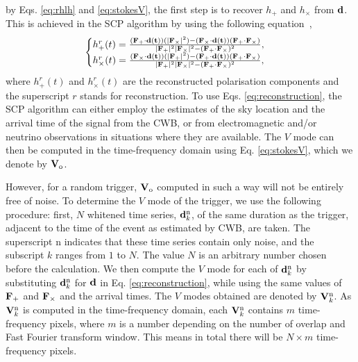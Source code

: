 \documentclass[aps,twocolumn,showpacs,groupedaddress, nofootinbib]{revtex4}  %
\begin{document}
by Eqs. \ref{eq:rhlh} and \ref{eq:stokesV},
the first step is to recover $h_+$ and $h_\times$ from $\bold{d}$.
This is achieved in the \ac{SCP} algorithm by using the following equation~\cite{di2018estimation},
\begin{equation}\label{eq:reconstruction}
\begin{cases} 
h^{r}_+(t) = \frac{(\bold{F}_+\cdot \bold{d}(\bold{t}))(\lvert\bold{F}_{\times}\rvert^{2}) - 
(\bold{F}_{\times}\cdot \bold{d}(\bold{t}))(\bold{F}_{+} \cdot \bold{F}_{\times})}
{\lvert\bold{F}_{+}\rvert^{2}\lvert\bold{F}_{\times}\rvert^{2} - (\bold{F}_{+} \cdot \bold{F}_{\times})^2},\\ 
h^{r}_\times(t) = \frac{(\bold{F}_{\times}\cdot \bold{d}(\bold{t}))(\lvert\bold{F}_{+}\rvert^{2}) - 
(\bold{F}_{+}\cdot \bold{d}(\bold{t}))(\bold{F}_{+} \cdot \bold{F}_{\times})}
{\lvert\bold{F}_{+}\rvert^{2}\lvert\bold{F}_{\times}\rvert^{2} - (\bold{F}_{+} \cdot \bold{F}_{\times})^2},\\
\end{cases} 
\end{equation}
where $h^{r}_+(t)$ and $h^{r}_\times(t) $ are the reconstructed polarisation components and the superscript $r$ stands for reconstruction. 
To use Eqs. \ref{eq:reconstruction}, the \ac{SCP} algorithm can either employ the estimates of the sky location and the arrival time of the signal from the \ac{CWB},
or from electromagnetic and/or neutrino observations in situations where they are available.  
The $V$ mode can then be computed in the time-frequency domain using Eq. \ref{eq:stokesV}, which we denote by $\bold{V}_\text{o}$.

However, for a random trigger, $\bold{V}_\text{o}$ computed in such a way will not be entirely free of noise.
To determine the $V$ mode of the trigger, we use the following procedure:
first, $N$ whitened time series, $\bold{d}^{\text{n}}_{k}$, of the same duration as the trigger, adjacent to the time of the event as estimated by \ac{CWB}, are taken.
The superscript $\text{n}$ indicates that these time series contain only noise, and the subscript $k$ ranges from $1$ to $N$.
The value $N$ is an arbitrary number chosen before the calculation.
We then compute the $V$ mode for each of $\bold{d}^{\text{n}}_{k}$ by substituting $\bold{d}^{\text{n}}_{k}$ for $\bold{d}$ in Eq. \ref{eq:reconstruction}, 
while using the same values of $\bold{F}_+$ and $\bold{F}_{\times}$
and the arrival times.
The $V$ modes obtained are denoted by $\bold{V}_{k}^{\text{n}}$.
As $\bold{V}_{k}^{\text{n}}$ is computed in the time-frequency domain, each $\bold{V}_{k}^{\text{n}}$ contains $m$ time-frequency pixels, 
where $m$ is a number depending on the number of overlap and Fast Fourier transform window.
This means in total there will be $N\times m$ time-frequency pixels.
\end{document}
